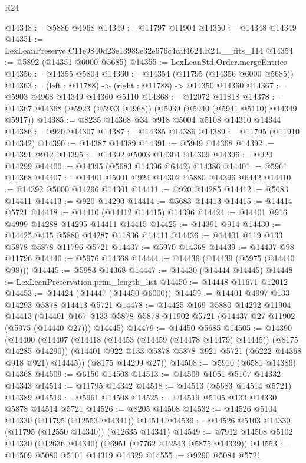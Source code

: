 \begin{lexlean}{R24}
\begin{coremodule}
@14348 := @5886 @4968
@14349 := @11797 @11904
@14350 := @14348 @14349
@14351 := LexLeanPreserve.C11e9840d23e13989e32e676c4caf4624.R24.__fits_114
@14354 := @5892 (@14351 @6000 @5685)
@14355 := LexLeanStd.Order.mergeEntries
@14356 := @14355 @5804
@14360 := @14354 (@11795 (@14356 @6000 @5685))
@14363 := (left : @11788) -> (right : @11788) -> @14350 @14360
@14367 := @5903 @4968 @14349 @14360 @5110
@14368 := @12072 @11818
@14378 := @14367 @14368 (@5923 (@5933 @4968)) (@5939 (@5940 (@5941 @5110) @14349 @5917))
@14385 := @8235 @14368 @34 @918 @5004 @5108 @14310 @14344
@14386 := @920 @14307
@14387 := @14385 @14386
@14389 := @11795 (@11910 @14342)
@14390 := @14387 @14389
@14391 := @5949 @14368
@14392 := @14391 @912
@14395 := @14392 @5003 @14304 @14309
@14396 := @920 @14299
@14400 := @14395 (@5683 @14396 @6442) @14386
@14401 := @5961 @14368
@14407 := @14401 @5001 @924 @14302 @5880 @14396 @6442
@14410 := @14392 @5000 @14296 @14301
@14411 := @920 @14285
@14412 := @5683 @14411
@14413 := @920 @14290
@14414 := @5683 @14413
@14415 := @14414 @5721
@14418 := @14410 (@14412 @14415) @14396
@14424 := @14401 @916 @4999 @14288 @14295 @14411 @14415
@14425 := @14391 @914
@14430 := @14425 @415 @5880 @14287 @11836 @14411
@14436 := @14401 @119 @133 @5878 @5878 @11796 @5721
@14437 := @5970 @14368
@14439 := @14437 @98 @11796
@14440 := @5976 @14368
@14444 := @14436 (@14439 (@5975 (@14440 @98)))
@14445 := @5983 @14368
@14447 := @14430 (@14444 @14445)
@14448 := LexLeanPreservation.prim_length_list
@14450 := @14448 @11671 @12012
@14453 := @14424 (@14447 (@14450 @6000))
@14459 := @14401 @4997 @133 @14293 @5878 @14413 @5721
@14478 := @14425
    @169
    @5880
    @14292
    @11904
    @14413
    (@14401 @167 @133 @5878 @5878 @11902 @5721 (@14437 @27 @11902 (@5975 (@14440 @27))) @14445)
@14479 := @14450 @5685
@14505 := @14390
    (@14400
      (@14407
        (@14418 (@14453 (@14459 (@14478 @14479) @14445)) (@8175 @14285 @14290))
        (@14401 @922 @133 @5878 @5878 @921 @5721 (@6222 @14368 @918 @921) @14445))
      (@8175 @14299 @27))
@14508 := @5910 (@6581 @14386) @14368
@14509 := @6150 @14508
@14513 := @14509 @1051 @5107 @14332 @14343
@14514 := @11795 @14342
@14518 := @14513 (@5683 @14514 @5721) @14389
@14519 := @5961 @14508
@14525 := @14519 @5105 @133 @14330 @5878 @14514 @5721
@14526 := @8205 @14508
@14532 := @14526 @5104 @14330 (@11795 (@12553 @14341)) @14514
@14539 := @14526 @5103 @14330 (@11795 (@12550 @14340)) (@12635 @14341)
@14549 := @7912 @14508 @5102 @14330 (@12636 @14340) (@6951 (@7762 @12543 @5875 @14339))
@14553 := @14509 @5080 @5101 @14319 @14329
@14555 := @9290 @5084 @5721

\end{coremodule}
\end{lexlean}
